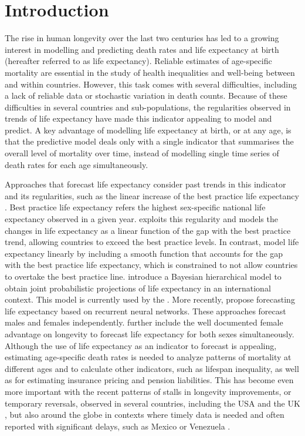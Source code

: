 \documentclass[a4,11pt]{article}
\begin{document}
\section{Introduction}
The rise in human longevity over the last two centuries has led to a growing interest in modelling and predicting death rates and life expectancy at birth (hereafter referred to as life expectancy). Reliable estimates of age-specific mortality are essential in the study of health inequalities and well-being between and within countries. However, this task comes with several difficulties, including a lack of reliable data or stochastic variation in death counts. Because of these difficulties in several countries and sub-populations, the regularities observed in trends of life expectancy have made this indicator appealing to model and predict. A key advantage of modelling life expectancy at birth, or at any age, is that the predictive model deals only with a single indicator that summarises the overall level of mortality over time, instead of modelling single time series of death rates for each age simultaneously. 

Approaches that forecast life expectancy consider past trends in this indicator and its regularities, such as the linear increase of the best practice life expectancy \citep{OV2002}. Best practice life expectancy refers the highest sex-specific national life expectancy observed in a given year. \citet{Lee2006} exploits this regularity and models the changes in life expectancy as a linear function of the gap with the best practice trend, allowing countries to exceed the best practice levels. In contrast, \cite{TorriVaupel12} model life expectancy linearly by including a smooth function that accounts for the gap with the best practice life expectancy, which is constrained to not allow countries to overtake the best practice line. \cite{Raftery13} introduce a Bayesian hierarchical model to obtain joint probabilistic projections of life expectancy in an international context. This model is currently used by the \cite{UN_2019}. More recently, \cite{Nigri19} propose forecasting life expectancy based on recurrent neural networks. These approaches forecast males and females independently. \cite{Pascariu18} further include the well documented female advantage on longevity \citep{luy2003causes} to forecast life expectancy for both sexes simultaneously. Although the use of life expectancy as an indicator to forecast is appealing, estimating age-specific death rates is needed to analyze patterns of mortality at different ages and to calculate other indicators, such as lifespan inequality, as well as for estimating insurance pricing and pension liabilities. This has become even more important with the recent patterns of stalls in longevity improvements, or temporary reversals, observed in several countries, including the USA and the UK \citep{mehta2020us,aburto2020EstimatingBurdenCOVID19,Ho}, but also around the globe in contexts where timely data is needed and often reported with significant delays, such as Mexico or Venezuela \citep{aburto_16,garcia_19}.
\end{document}

